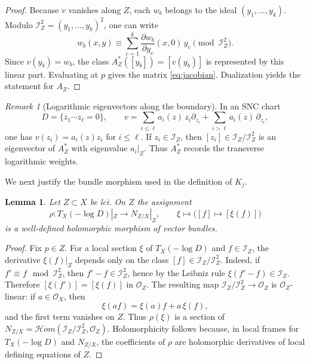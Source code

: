 \documentclass[12pt,a4paper,dvipsnames,x11names]{amsart}
\numberwithin{equation}{section}
\theoremstyle{plain}
\newtheorem{lemma}[theorem]{Lemma}
\theoremstyle{definition}
\theoremstyle{remark}
\newtheorem{remark}[theorem]{Remark}
\newcommand{\II}{\mathscr I}
\newcommand{\OO}{\mathscr O}
\begin{document}
\begin{proof}
Because $v$ vanishes along $Z$, each $w_b$ belongs to the ideal $(y_1,\dots,y_k)$. Modulo $\II_Z^2=(y_1,\dots,y_k)^2$, one can write
\begin{equation}\label{eq:w-linear-part}
w_b(x,y)\equiv \sum_{c=1}^k \frac{\partial w_b}{\partial y_c}(x,0)\,y_c \pmod{\II_Z^2}.
\end{equation}
Since $v(y_b)=w_b$, the class $A_Z^*([y_b])=[v(y_b)]$ is represented by this linear part. Evaluating at $p$ gives the matrix \eqref{eq:jacobian}. Dualization yields the statement for $A_Z$.
\end{proof}

\begin{remark}[Logarithmic eigenvectors along the boundary]\label{rem:log-eigen}
In an SNC chart
\begin{equation}\label{eq:snc-eigen-chart}
D=\{z_1\cdots z_\ell=0\},
\qquad
v=\sum_{i\le \ell} a_i(z)\,z_i\partial_{z_i}+\sum_{i>\ell} a_i(z)\,\partial_{z_i},
\end{equation}
one has $v(z_i)=a_i(z)z_i$ for $i\le \ell$. If $z_i\in \II_Z$, then $[z_i]\in \II_Z/\II_Z^2$ is an eigenvector of $A_Z^*$ with eigenvalue $a_i|_Z$. Thus $A_Z^*$ records the transverse logarithmic weights.
\end{remark}

We next justify the bundle morphism used in the definition of $K_j$.

\begin{lemma}\label{lem:rho-well-defined}
Let $Z\subset X$ be lci. On $Z$ the assignment
\begin{equation}\label{eq:rho-map}
\rho:T_X(-\log D)|_{Z}\longrightarrow N_{Z/X}|_{Z},
\qquad
\xi\longmapsto \big([f]\mapsto [\xi(f)]\big)
\end{equation}
is a well-defined holomorphic morphism of vector bundles.
\end{lemma}

\begin{proof}
Fix $p\in Z$. For a local section $\xi$ of $T_X(-\log D)$ and $f\in \II_Z$, the derivative $\xi(f)|_Z$ depends only on the class $[f]\in \II_Z/\II_Z^2$. Indeed, if $f'\equiv f \mod \II_Z^2$, then $f'-f\in \II_Z^2$, hence by the Leibniz rule $\xi(f'-f)\in \II_Z$. Therefore $[\xi(f')]=[\xi(f)]$ in $\OO_Z$.
The resulting map $\II_Z/\II_Z^2\to \OO_Z$ is $\OO_Z$-linear: if $a\in \OO_X$, then
\begin{equation}\label{eq:rho-linearity-proof}
\xi(af)=\xi(a)f+a\,\xi(f),
\end{equation}
and the first term vanishes on $Z$. Thus $\rho(\xi)$ is a section of $N_{Z/X}=  \mathscr{H}om(\II_Z/\II_Z^2,\OO_Z)$. Holomorphicity follows because, in local frames for $T_X(-\log D)$ and $N_{Z/X}$, the coefficients of $\rho$ are holomorphic derivatives of local defining equations of $Z$.
\end{proof}
\end{document}
